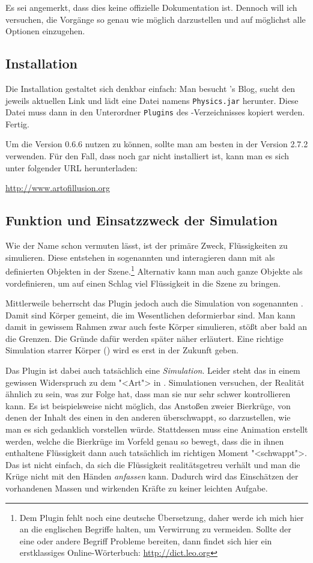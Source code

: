 \documentclass[12pt,a4paper]{scrartcl}
\begin{document}
Es sei angemerkt, dass dies keine offizielle Dokumentation ist. Dennoch
will ich versuchen, die Vorgänge so genau wie möglich darzustellen und
auf möglichst alle Optionen einzugehen.

\subsection{Installation}
Die Installation gestaltet sich denkbar einfach: Man besucht \deltor's
Blog, sucht den jeweils aktuellen Link und lädt eine Datei namens
\texttt{Physics.jar} herunter. Diese Datei muss dann in den Unterordner
\texttt{Plugins} des \aoi-Verzeichnisses kopiert werden. Fertig.

Um die Version 0.6.6 nutzen zu können, sollte man am besten \aoi
in der Version 2.7.2 verwenden. Für den Fall, dass \aoi noch gar nicht
installiert ist, kann man es sich unter folgender URL herunterladen:

\url{http://www.artofillusion.org}

\subsection{Funktion und Einsatzzweck der Simulation}
Wie der Name schon vermuten lässt, ist der primäre Zweck, Flüssigkeiten
zu simulieren. Diese entstehen in sogenannten  und
interagieren dann mit als  definierten Objekten in der
Szene.\footnote{Dem Plugin fehlt noch eine deutsche Übersetzung, daher
werde ich mich hier an die englischen Begriffe halten, um Verwirrung zu
vermeiden. Sollte der eine oder andere Begriff Probleme bereiten, dann
findet sich hier ein erstklassiges Online-Wörterbuch:
\url{http://dict.leo.org}} Alternativ kann man auch ganze Objekte
als  vordefinieren, um auf einen Schlag viel Flüssigkeit in die
Szene zu bringen.

Mittlerweile beherrscht das Plugin jedoch auch die Simulation von
sogenannten . Damit sind Körper gemeint, die im
Wesentlichen deformierbar sind. Man kann damit in gewissem Rahmen zwar
auch feste Körper simulieren, stößt aber bald an die Grenzen. Die Gründe
dafür werden später näher erläutert. Eine richtige Simulation starrer
Körper () wird es erst in der Zukunft geben.

Das Plugin ist dabei auch tatsächlich eine \emph{Simulation}. Leider
steht das in einem gewissen Widerspruch zu dem "<Art"> in \aoi.
Simulationen versuchen, der Realität ähnlich zu sein, was zur Folge hat,
dass man sie nur sehr schwer kontrollieren kann. Es ist beispielsweise
nicht möglich, das Anstoßen zweier Bierkrüge, von denen der Inhalt des
einen in den anderen überschwappt, so darzustellen, wie man es sich
gedanklich vorstellen würde. Stattdessen muss eine Animation erstellt
werden, welche die Bierkrüge im Vorfeld genau so bewegt, dass die in
ihnen enthaltene Flüssigkeit dann auch tatsächlich im richtigen Moment
"<schwappt">.  Das ist nicht einfach, da sich die Flüssigkeit
realitätsgetreu verhält und man die Krüge nicht mit den Händen
\emph{anfassen} kann. Dadurch wird das Einschätzen der vorhandenen
Massen und wirkenden Kräfte zu keiner leichten Aufgabe.
\end{document}
